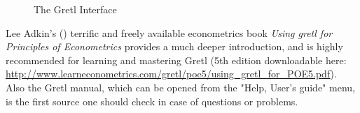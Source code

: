 \documentclass[11pt]{article}
\begin{document}
\begin{figure}[h!]
	\centering
	\caption{The Gretl Interface}
	
	
	\label{fig:GUI}
\end{figure}


Lee Adkin's (\citeyear{Adkins2018}) terrific and freely available econometrics book \emph{Using gretl for Principles of Econometrics} provides a much deeper introduction, and is highly recommended for learning and mastering Gretl (5th edition downloadable here: \\ \url{http://www.learneconometrics.com/gretl/poe5/using_gretl_for_POE5.pdf}). Also the Gretl manual, which can be opened from the "Help, User's guide" menu, is the first source one should check in case of questions or problems.
\end{document}
